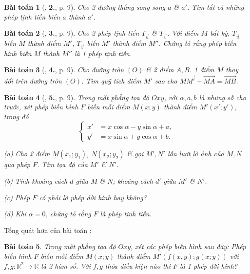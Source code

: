 \documentclass{article}
\numberwithin{equation}{section}
\newtheorem{baitoan}{Bài toán}[section]
\begin{document}
\begin{baitoan}[\cite{SGK_Toan_11_hinh_hoc_nang_cao}, \textbf{2.}, p. 9]
	Cho 2 đường thẳng song song $a$ \& $a'$. Tìm tất cả những phép tịnh tiến biến $a$ thành $a'$.
\end{baitoan}

\begin{baitoan}[\cite{SGK_Toan_11_hinh_hoc_nang_cao}, \textbf{3.}, p. 9]
	Cho 2 phép tịnh tiến $T_{\vec{u}}$ \& $T_{\vec{v}}$. Với điểm $M$ bất kỳ, $T_{\vec{u}}$ biến $M$ thành điểm $M'$, $T_{\vec{v}}$ biến $M'$ thành điểm $M''$. Chứng tỏ rằng phép biến hình biến $M$ thành $M''$ là 1 phép tịnh tiến.
\end{baitoan}

\begin{baitoan}[\cite{SGK_Toan_11_hinh_hoc_nang_cao}, \textbf{4.}, p. 9]
	Cho đường tròn $(O)$ \& 2 điểm $A,B$. 1 điểm $M$ thay đổi trên đường tròn $(O)$. Tìm quỹ tích điểm $M'$ sao cho $\overrightarrow{MM'} + \overrightarrow{MA} = \overrightarrow{MB}$.
\end{baitoan}

\begin{baitoan}[\cite{SGK_Toan_11_hinh_hoc_nang_cao}, \textbf{5.}, p. 9]
	Trong mặt phẳng tọa độ $Oxy$, với $\alpha,a,b$ là những số cho trước, xét phép biến hình $F$ biến mỗi điểm $M(x;y)$ thành điểm $M'(x';y')$, trong đó
	\begin{equation*}
		\left\{\begin{split}
			x' &= x\cos\alpha - y\sin\alpha + a,\\
			y' &= x\sin\alpha + y\cos\alpha + b.
		\end{split}\right.
	\end{equation*}
	\begin{enumerate*}
		\item[(a)] Cho 2 điểm $M(x_1;y_1)$, $N(x_2;y_2)$ \& gọi $M',N'$ lần lượt là ảnh của $M,N$ qua phép $F$. Tìm tọa độ của $M'$ \& $N'$.
		\item[(b)] Tính khoảng cách $d$ giữa $M$ \& $N$; khoảng cách $d'$ giữa $M'$ \& $N'$.
		\item[(c)] Phép $F$ có phải là phép dời hình hay không?
		\item[(d)] Khi $\alpha = 0$, chứng tỏ rằng $F$ là phép tịnh tiến.
	\end{enumerate*}
\end{baitoan}
Tổng quát hơn của bài toán \cite[\textbf{6.}, p. 9]{SGK_Toan_11_hinh_hoc_nang_cao}:
\begin{baitoan}
	Trong mặt phẳng tọa độ $Oxy$, xét các phép biến hình sau đây: Phép biến hình $F$ biến mỗi điểm $M(x;y)$ thành điểm $M'(f(x,y);g(x;y))$ với $f,g:\mathbb{R}^2\to\mathbb{R}$ là 2 hàm số. Với $f,g$ thỏa điều kiện nào thì $F$ là 1 phép dời hình?
\end{baitoan}
\end{document}
